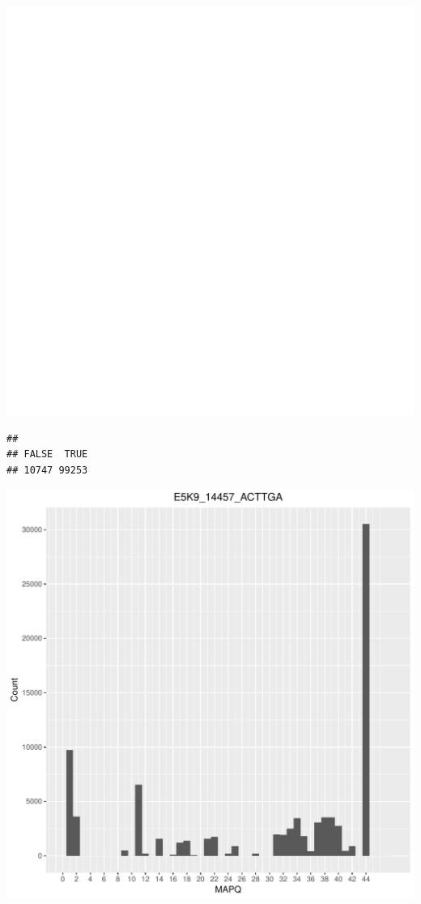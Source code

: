 \documentclass[12pt, a4paper]{article}\usepackage[]{graphicx}\usepackage[]{color}
\makeatletter
\def\maxwidth{ %
  \ifdim\Gin@nat@width>\linewidth
    \linewidth
  \else
    \Gin@nat@width
  \fi
}
\newenvironment{kframe}{%
 \def\at@end@of@kframe{}%
 \ifinner\ifhmode%
  \def\at@end@of@kframe{\end{minipage}}%
  \begin{minipage}{\columnwidth}%
 \fi\fi%
 \def\FrameCommand##1{\hskip\@totalleftmargin \hskip-\fboxsep
 \colorbox{shadecolor}{##1}\hskip-\fboxsep
     \hskip-\linewidth \hskip-\@totalleftmargin \hskip\columnwidth}%
 \MakeFramed {\advance\hsize-\width
   \@totalleftmargin\z@ \linewidth\hsize
   \@setminipage}}%
 {\par\unskip\endMakeFramed%
 \at@end@of@kframe}
\newenvironment{knitrout}{}{} %
\makeatother
\begin{document}
\begin{knitrout}
\includegraphics[width=\maxwidth]{figure/unnamed-chunk-3-4} 
\begin{kframe}\begin{verbatim}
## 
## FALSE  TRUE 
## 10747 99253
\end{verbatim}
\end{kframe}
\includegraphics[width=\maxwidth]{figure/unnamed-chunk-3-5} 


\end{knitrout}
\end{document}
